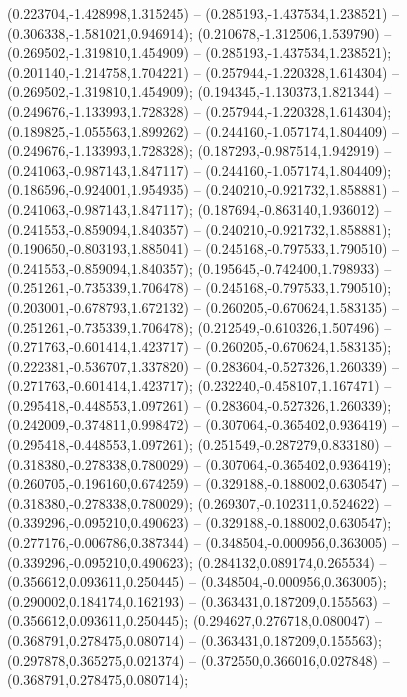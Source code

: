  (0.223704,-1.428998,1.315245) -- (0.285193,-1.437534,1.238521) -- (0.306338,-1.581021,0.946914);
 (0.210678,-1.312506,1.539790) -- (0.269502,-1.319810,1.454909) -- (0.285193,-1.437534,1.238521);
 (0.201140,-1.214758,1.704221) -- (0.257944,-1.220328,1.614304) -- (0.269502,-1.319810,1.454909);
 (0.194345,-1.130373,1.821344) -- (0.249676,-1.133993,1.728328) -- (0.257944,-1.220328,1.614304);
 (0.189825,-1.055563,1.899262) -- (0.244160,-1.057174,1.804409) -- (0.249676,-1.133993,1.728328);
 (0.187293,-0.987514,1.942919) -- (0.241063,-0.987143,1.847117) -- (0.244160,-1.057174,1.804409);
 (0.186596,-0.924001,1.954935) -- (0.240210,-0.921732,1.858881) -- (0.241063,-0.987143,1.847117);
 (0.187694,-0.863140,1.936012) -- (0.241553,-0.859094,1.840357) -- (0.240210,-0.921732,1.858881);
 (0.190650,-0.803193,1.885041) -- (0.245168,-0.797533,1.790510) -- (0.241553,-0.859094,1.840357);
 (0.195645,-0.742400,1.798933) -- (0.251261,-0.735339,1.706478) -- (0.245168,-0.797533,1.790510);
 (0.203001,-0.678793,1.672132) -- (0.260205,-0.670624,1.583135) -- (0.251261,-0.735339,1.706478);
 (0.212549,-0.610326,1.507496) -- (0.271763,-0.601414,1.423717) -- (0.260205,-0.670624,1.583135);
 (0.222381,-0.536707,1.337820) -- (0.283604,-0.527326,1.260339) -- (0.271763,-0.601414,1.423717);
 (0.232240,-0.458107,1.167471) -- (0.295418,-0.448553,1.097261) -- (0.283604,-0.527326,1.260339);
 (0.242009,-0.374811,0.998472) -- (0.307064,-0.365402,0.936419) -- (0.295418,-0.448553,1.097261);
 (0.251549,-0.287279,0.833180) -- (0.318380,-0.278338,0.780029) -- (0.307064,-0.365402,0.936419);
 (0.260705,-0.196160,0.674259) -- (0.329188,-0.188002,0.630547) -- (0.318380,-0.278338,0.780029);
 (0.269307,-0.102311,0.524622) -- (0.339296,-0.095210,0.490623) -- (0.329188,-0.188002,0.630547);
 (0.277176,-0.006786,0.387344) -- (0.348504,-0.000956,0.363005) -- (0.339296,-0.095210,0.490623);
 (0.284132,0.089174,0.265534) -- (0.356612,0.093611,0.250445) -- (0.348504,-0.000956,0.363005);
 (0.290002,0.184174,0.162193) -- (0.363431,0.187209,0.155563) -- (0.356612,0.093611,0.250445);
 (0.294627,0.276718,0.080047) -- (0.368791,0.278475,0.080714) -- (0.363431,0.187209,0.155563);
 (0.297878,0.365275,0.021374) -- (0.372550,0.366016,0.027848) -- (0.368791,0.278475,0.080714);

